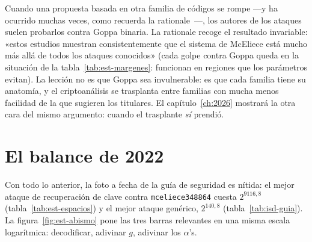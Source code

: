 \begin{trampa}
Cuando una propuesta basada en otra familia de códigos se rompe
---y ha ocurrido muchas veces, como recuerda la
rationale~\cite{cmrationale}---, los autores de los ataques suelen
probarlos contra Goppa binaria. La rationale recoge el resultado
invariable: «estos estudios muestran consistentemente que el sistema
de McEliece está mucho más allá de todos los ataques conocidos»
(cada golpe contra Goppa queda en la situación de la
tabla~\ref{tab:est-margenes}: funcionan en regiones que los
parámetros evitan). La lección no es que Goppa sea invulnerable: es
que cada familia tiene su anatomía, y el criptoanálisis se trasplanta
entre familias con mucha menos facilidad de la que sugieren los
titulares. El capítulo~\ref{ch:2026} mostrará la otra cara del mismo
argumento: cuando el trasplante \emph{sí} prendió.
\end{trampa}

\section{El balance de 2022}\label{sec:est-balance}

Con todo lo anterior, la foto a fecha de la guía de seguridad es
nítida: el mejor ataque de recuperación de clave contra
\texttt{mceliece348864} cuesta $2^{9116{,}8}$ (tabla~\ref{tab:est-espacios})
y el mejor ataque genérico, $2^{140{,}8}$ (tabla~\ref{tab:isd-guia}).
La figura~\ref{fig:est-abismo} pone las tres barras relevantes en una
misma escala logarítmica: decodificar, adivinar $g$, adivinar los
$\alpha$'s.

